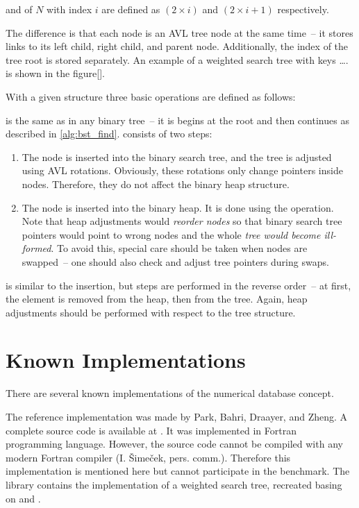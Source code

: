  and  of $N$ with index $i$ are defined as $(2 \times i)$ and $(2 \times i + 1)$ respectively.


The difference is that each node is an AVL tree node at the same time~-- it stores links to its left child, right child, and parent node. Additionally, the index of the tree root is stored separately. An example of a weighted search tree with keys …. is shown in the figure[].

With a given structure three basic operations are defined as follows:
\begin{block-description}
\blockitem[\findop] is the same as in any binary tree~-- it is begins at the root and then continues as described in \cref{alg:bst_find}.
\blockitem[\insertop] consists of two steps:
  \begin{enumerate}
  \item The node is inserted into the binary search tree, and the tree is adjusted using AVL rotations. Obviously, these rotations only change pointers inside nodes. Therefore, they do not affect the binary heap structure.
  \item The node is inserted into the binary heap. It is done using the  operation\cite{sedgewick}. Note that heap adjustments would \emph{reorder nodes} so that binary search tree pointers would point to wrong nodes and the whole \emph{tree would become ill-formed}. To avoid this, special care should be taken when nodes are swapped~-- one should also check and adjust tree pointers during swaps.
  \end{enumerate}
\blockitem[\removeop] is similar to the insertion, but steps are performed in the reverse order~-- at first, the element is removed from the heap, then from the tree. Again, heap adjustments should be performed with respect to the tree structure.
\end{block-description}

\section{Known Implementations}

There are several known implementations of the numerical database concept.

The reference implementation was made by Park, Bahri, Draayer, and Zheng. A complete source code is available at \cite{wstree}. It was implemented in Fortran programming language. However, the source code cannot be compiled with any modern Fortran compiler (I. Šimeček, pers. comm.). Therefore this implementation is mentioned here but cannot participate in the benchmark. The \numdbname library contains the implementation of a weighted search tree, recreated basing on \cite{park90} and \cite{park94}.

